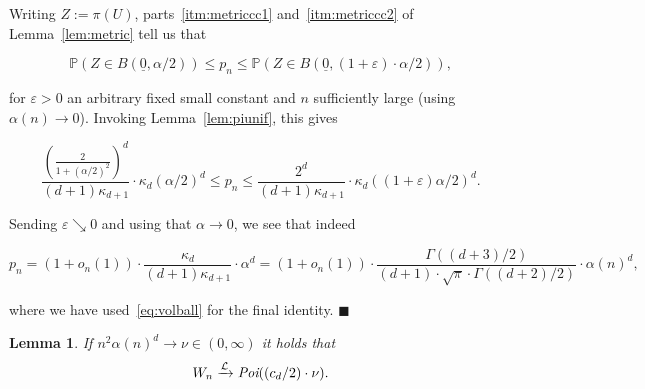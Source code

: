 \documentclass[11pt]{article}%
\newenvironment{proof}{\vspace{1ex}\noindent{\bf Proof.}}{\hspace*{\fill}$\blacksquare$\vspace{1ex}}
\newtheorem{lemma}[lemma]{Lemma}
\newcommand{\Pee}[0]{\ensuremath{{\mathbb P}}}
\newcommand{\eps}{\varepsilon}
\newcommand{\orig}{\underline{0}}
\begin{document}
\begin{proof}
Writing $Z := \pi(U)$, parts~\ref{itm:metriccc1} and~\ref{itm:metriccc2} of Lemma~\ref{lem:metric} tell us that

$$ \Pee( Z \in B(\orig,\alpha/2 )) \leq p_n \leq \Pee( Z \in B(\orig,(1+\eps)\cdot\alpha/2 )), $$

\noindent 
for $\eps>0$ an arbitrary fixed small constant and $n$ sufficiently large (using $\alpha(n)\to 0$). 
Invoking Lemma~\ref{lem:piunif}, this gives

$$ \frac{\left(\frac{2}{1+(\alpha/2)^2}\right)^d}{(d+1)\kappa_{d+1}}  \cdot \kappa_d (\alpha/2)^d 
\leq p_n \leq \frac{2^d}{(d+1)\kappa_{d+1}} \cdot \kappa_d((1+\eps)\alpha/2)^d. $$

\noindent 
Sending $\eps\searrow 0$ and using that $\alpha \to 0$, we see that indeed 

$$ p_n = (1+o_n(1)) \cdot \frac{\kappa_d}{(d+1)\kappa_{d+1}} \cdot \alpha^d 
= (1+o_n(1)) \cdot %
\frac{\Gamma((d+3)/2)}{(d+1)\cdot \sqrt{\pi} \cdot \Gamma((d+2)/2)} \cdot \alpha(n)^d, $$

\noindent 
where we have used~\eqref{eq:volball} for the final identity.
\end{proof}


\begin{lemma}\label{empty2}
	If $ n^2\alpha(n)^d\to \nu\in (0,\infty) $  it holds that
	\begin{equation*}
		W_n\xrightarrow{\mathcal L} \emph{\text{Poi}}( (c_d/2) \cdot \nu ).
	\end{equation*}
\end{lemma}
\end{document}
